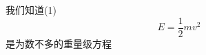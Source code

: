 \documentclass[12pt, a4paper, oneside]{ctexart}
\begin{document}
	我们知道(1)
	\begin{equation}
		E=\frac{1}{2}mv^2
	\end{equation}
	是为数不多的重量级方程
\end{document}
